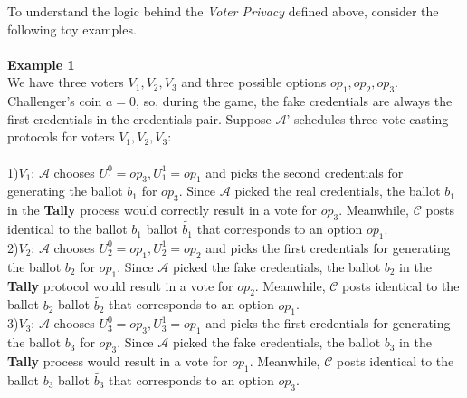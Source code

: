 To understand the logic behind the \textit{Voter Privacy} defined above, consider the following toy examples.\\\\
\textbf{Example 1}\\
We have three voters $V_1,V_2,V_3$ and three possible options $op_1,op_2,op_3$. Challenger's coin $a=0$, so, during the game, the fake credentials are always the first credentials in the credentials pair.
Suppose  $\mathcal{A}$' schedules three vote casting protocols for voters $V_1,V_2,V_3$: \\\\
1)$\boxed{V_1}$:  $\mathcal{A}$ chooses $U^0_1 = op_3, U^1_1 = op_1$ and picks the second credentials for generating the ballot $b_1$ for $op_3$. Since  $\mathcal{A}$ picked the real credentials, the ballot $b_1$ in the \textbf{Tally} process would correctly result in a vote for $op_3$. Meanwhile, $\mathcal{C}$ posts identical to the ballot $b_1$ ballot $\tilde{b_1}$ that corresponds to an option $op_1$.\\
2)$\boxed{V_2}$: $\mathcal{A}$ chooses $U^0_2 = op_1, U^1_2 = op_2$ and picks the first credentials for generating the ballot $b_2$ for $op_1$. Since  $\mathcal{A}$ picked the fake credentials, the ballot $b_2$ in the \textbf{Tally} protocol would result in a vote for $op_2$. Meanwhile, $\mathcal{C}$ posts identical to the ballot $b_2$ ballot $\tilde{b_2}$ that corresponds to an option $op_1$.\\
3)$\boxed{V_3}$:  $\mathcal{A}$ chooses $U^0_3 = op_3, U^1_3 = op_1$ and picks the first credentials for generating the ballot $b_3$ for $op_3$. Since  $\mathcal{A}$ picked the fake credentials, the ballot $b_3$ in the \textbf{Tally} process would  result in a vote for $op_1$. Meanwhile, $\mathcal{C}$ posts identical to the ballot $b_3$ ballot $\tilde{b_3}$ that corresponds to an option $op_3$.\\


